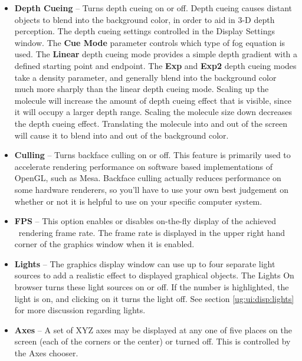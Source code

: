 \begin{itemize}
  \item {\bf Depth Cueing} --
Turns depth cueing on or off.  Depth cueing causes distant objects to 
blend into the background color, in order to aid in 3-D depth perception.
The depth cueing settings controlled in the {Display Settings} window.
The {\bf Cue Mode} parameter controls which type of fog equation is
used.  The {\bf Linear} depth cueing mode provides a simple depth
gradient with a defined starting point and endpoint.  The 
{\bf Exp} and {\bf Exp2} depth cueing modes take a density parameter,
and generally blend into the background color much more sharply than
the linear depth cueing mode.
Scaling up the molecule will increase the amount of depth cueing
effect that is visible, since it will occupy a larger depth range.
Scaling the molecule size down decreases the depth cueing effect.  
Translating the molecule into and out of the screen will cause it
to blend into and out of the background color.

  \item {\bf Culling} --
Turns backface culling on or off.  This feature is primarily used
to accelerate rendering performance on software based implementations
of OpenGL, such as Mesa.  Backface culling actually reduces performance
on some hardware renderers, so you'll have to use your own best judgement
on whether or not it is helpful to use on your specific computer system.

  \item {\bf FPS} --
This option enables or disables on-the-fly display of the achieved
\VMD\ rendering frame rate.  The frame rate is displayed in the upper
right hand corner of the graphics window when it is enabled.

  \item {\bf Lights} --
The graphics display window can use up to four separate light sources
to add a realistic effect to displayed graphical objects.
The {\sf Lights On} browser turns these light sources on or off.  If the
number is highlighted, the light is on, and clicking on it turns the
light off.  See 
section \ref{ug:ui:disp:lights}
for more discussion regarding lights.

  \item {\bf Axes} --
A set of XYZ axes may be displayed at any one of five places on
the screen (each of the corners or the center) or turned off.  This is
controlled by the {\sf Axes} chooser.


\end{itemize}
